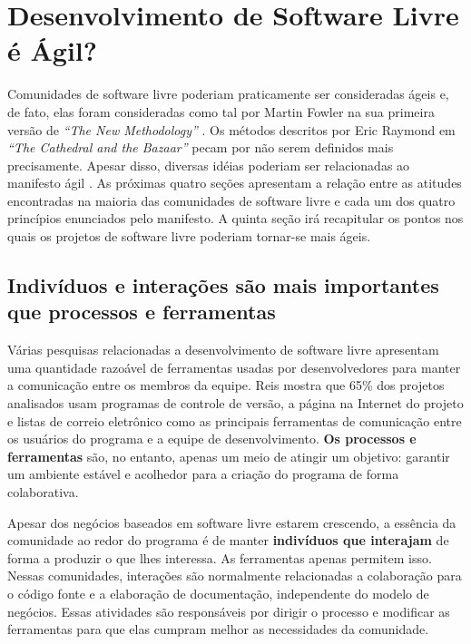 \chapter{Desenvolvimento de Software Livre é Ágil?}
\label{cap:foss}

Comunidades de software livre poderiam praticamente ser consideradas
ágeis e, de fato, elas foram consideradas como tal por Martin Fowler
na sua primeira versão de \emph{``The New Methodology''}
\cite{Fowler00orig}. Os métodos descritos por Eric Raymond em
\emph{``The Cathedral and the Bazaar''} \cite{Raymond1999} pecam por
não serem definidos mais precisamente. Apesar disso, diversas idéias
poderiam ser relacionadas ao manifesto ágil \cite{AgileManifesto}. As
próximas quatro seções apresentam a relação entre as atitudes
encontradas na maioria das comunidades de software livre e cada um dos
quatro princípios enunciados pelo manifesto. A quinta seção irá
recapitular os pontos nos quais os projetos de software livre poderiam
tornar-se mais ágeis.

\section{Indivíduos e interações são mais importantes que processos e
  ferramentas}
\label{sec:first-princ}

Várias pesquisas relacionadas a desenvolvimento de software livre
apresentam uma quantidade razoável de ferramentas usadas por
desenvolvedores para manter a comunicação entre os membros da
equipe. Reis \cite{Reis2003} mostra que 65\% dos projetos analisados
usam programas de controle de versão, a página na Internet do projeto
e listas de correio eletrônico como as principais ferramentas de
comunicação entre os usuários do programa e a equipe de
desenvolvimento. \textbf{Os processos e ferramentas} são, no entanto,
apenas um meio de atingir um objetivo: garantir um ambiente estável e
acolhedor para a criação do programa de forma colaborativa.

Apesar dos negócios baseados em software livre estarem crescendo, a
essência da comunidade ao redor do programa é de manter
\textbf{indivíduos que interajam} de forma a produzir o que lhes
interessa. As ferramentas apenas permitem isso. Nessas comunidades,
interações são normalmente relacionadas a colaboração para o código
fonte e a elaboração de documentação, independente do modelo de
negócios. Essas atividades são responsáveis por dirigir o processo e
modificar as ferramentas para que elas cumpram melhor as necessidades
da comunidade.

